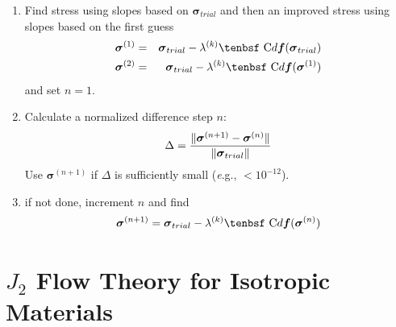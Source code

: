 \documentclass[11pt]{book}
\renewcommand{\vec}[1]{\boldsymbol{#1}}
\def\C{\hbox{\tenbsf C}}
\def\df{d \vec{f}}
\begin{document}
\begin{enumerate}

\item Find stress using slopes based on ${\vec\sigma_{trial}}$ and then an improved stress using slopes based on the first guess
\begin{eqnarray}
      {\vec\sigma}^{(1)} & = & {\vec\sigma_{trial}} - \lambda^{(k)}\C\df({\vec\sigma_{trial}}) \\
      {\vec\sigma}^{(2)} & = & {\vec\sigma_{trial}} - \lambda^{(k)}\C\df({\vec\sigma}^{(1)}) 
\end{eqnarray}
and set $n=1$.

\item Calculate a normalized difference step $n$:
\begin{equation}
        \Delta = {\|{\vec\sigma}^{(n+1)}-{\vec\sigma}^{(n)}\|\over \|{\vec\sigma_{trial}}\|}
\end{equation}
Use ${\vec\sigma}^{(n+1)}$ if $\Delta$ is sufficiently small ({\emph e.g.}, $<10^{-12}$).

\item if not done, increment $n$ and find
\begin{equation}
      {\vec\sigma}^{(n+1)} = {\vec\sigma_{trial}} - \lambda^{(k)}\C\df({\vec\sigma}^{(n)}) 
\end{equation}

\end{enumerate}

\section{$J_2$ Flow Theory for Isotropic Materials\label{J2ISO}}
\end{document}
